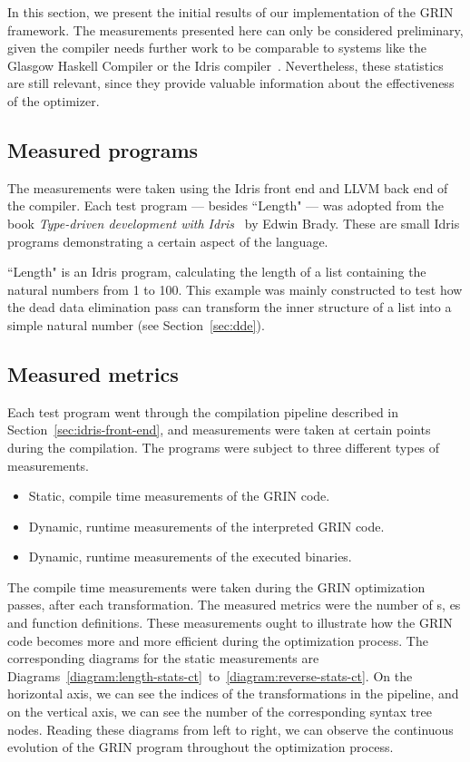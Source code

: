 \documentclass[main.tex]{subfiles}
\begin{document}
	
	In this section, we present the initial results of our implementation of the GRIN framework. The measurements presented here can only be considered preliminary, given the compiler needs further work to be comparable to systems like the Glasgow Haskell Compiler or the Idris compiler~\cite{idris}. Nevertheless, these statistics are still relevant, since they provide valuable information about the effectiveness of the optimizer.
	
	\subsection{Measured programs}
	
	The measurements were taken using the Idris front end and LLVM back end of the compiler. Each test program --- besides ``Length" --- was adopted from the book \textit{Type-driven development with Idris}~\cite{tdd-idris} by Edwin Brady. These are small Idris programs demonstrating a certain aspect of the language.
	
	``Length" is an Idris program, calculating the length of a list containing the natural numbers from 1 to 100. This example was mainly constructed to test how the dead data elimination pass can transform the inner structure of a list into a simple natural number (see Section~\ref{sec:dde}).
	
	\subsection{Measured metrics}
	
	Each test program went through the compilation pipeline described in Section~\ref{sec:idris-front-end}, and measurements were taken at certain points during the compilation. The programs were subject to three different types of measurements.
	
	\vspace{0.25cm}
	\begin{itemize}
		\item Static, compile time measurements of the GRIN code.
		\item Dynamic, runtime measurements of the interpreted GRIN code.
		\item Dynamic, runtime measurements of the executed binaries.
	\end{itemize}
	\vspace{0.25cm}

	The compile time measurements were taken during the GRIN optimization passes, after each transformation. The measured metrics were the number of s, es and function definitions. These measurements ought to illustrate how the GRIN code becomes more and more efficient during the optimization process. The corresponding diagrams for the static measurements are Diagrams~\ref{diagram:length-stats-ct}~to~\ref{diagram:reverse-stats-ct}. On the horizontal axis, we can see the indices of the transformations in the pipeline, and on the vertical axis, we can see the number of the corresponding syntax tree nodes. Reading these diagrams from left to right, we can observe the continuous evolution of the GRIN program throughout the optimization process.
	
\end{document}
